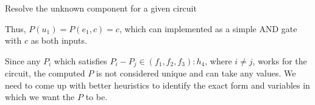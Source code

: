 \begin{algorithm}
\caption{Resolve the unknown component for a given circuit}
\label{algo:unknownComponent}
\begin{algorithmic}[1]

\Else
{}
\EndIf
\EndWhile
\EndProcedure


\EndProcedure
\end{algorithmic}
\end{algorithm}









Thus, $P(u_1)=P(e_1,c)=c$, which can implemented as a simple AND gate with $c$ as both inputs. 

Since any $P_i$ which satisfies $P_i-P_j\in(f_1,f_2,f_3):h_4$, where $i\neq j$, works for the circuit, the computed $P$ is not considered unique and can take any values. We need to come up with better heuristics to identify the exact form and variables in which we want the $P$ to be. 



